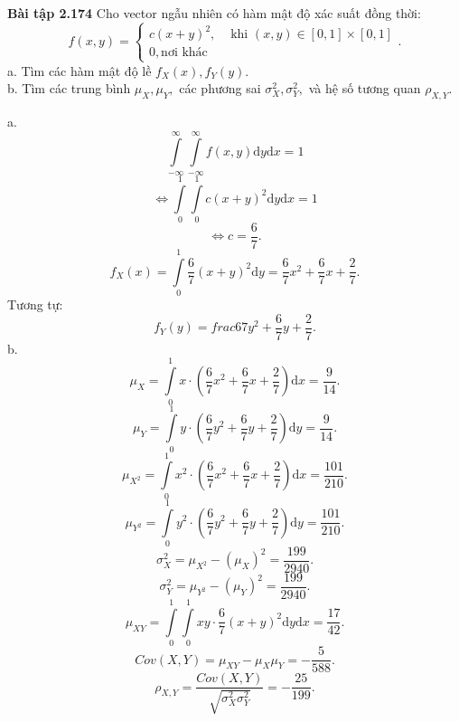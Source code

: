 \documentclass[12pt,a4paper]{article}
\begin{document}
\begin{mybox}
    \textbf{Bài tập 2.174} Cho vector ngẫu nhiên có hàm mật độ xác suất đồng thời:
    $$f \left( {x, y} \right) = 
    \begin{cases}
        c \left( {x + y} \right)^2, &\text{ khi } \left( {x, y} \right) \in \left[ {0, 1} \right] \times \left[ {0, 1} \right]\\
        0, \text{nơi khác}
    \end{cases}
    .$$
    a. Tìm các hàm mật độ lề $f_X \left( x \right), f_Y \left( y \right).$\\
    b. Tìm các trung bình $\mu_X, \mu_Y,$ các phương sai $\sigma _X^2, \sigma_Y^2,$ và hệ số tương quan $\rho_{X, Y}.$
\end{mybox}
a. $$\int\limits_{- \infty}^{\infty}{\int\limits_{- \infty}^{\infty}{f \left( {x, y} \right) \mathrm{d}y}\mathrm{d}x} = 1$$
$$\Leftrightarrow \int\limits_{0}^{1}{\int\limits_{0}^{1}{ c \left( {x + y} \right)^2  \mathrm{d}y}\mathrm{d}x} = 1$$
$$\Leftrightarrow c = \frac{6}{7}.$$
$$f_X \left( x \right) = \int\limits_{0}^{1}{ \frac{6}{7} \left( {x + y} \right)^2  \mathrm{d}y} = \frac{6}{7}x^2 + \frac{6}{7}x + \frac{2}{7}.$$
Tương tự:
$$f_Y \left( y \right) = frac{6}{7}y^2 + \frac{6}{7}y + \frac{2}{7}.$$
b. $$\mu_X = \int\limits_0^1{x \cdot \left( {\frac{6}{7}x^2 + \frac{6}{7}x + \frac{2}{7}} \right) \mathrm{d}x} = \frac{9}{14}.$$
$$\mu_Y = \int\limits_0^1{y \cdot \left( {\frac{6}{7}y^2 + \frac{6}{7}y + \frac{2}{7}} \right) \mathrm{d}y} = \frac{9}{14}.$$
$$\mu_{X^2} = \int\limits_0^1{x^2 \cdot \left( {\frac{6}{7}x^2 + \frac{6}{7}x + \frac{2}{7}} \right) \mathrm{d}x} = \frac{101}{210}.$$
$$\mu_{Y^2} = \int\limits_0^1{y^2 \cdot \left( {\frac{6}{7}y^2 + \frac{6}{7}y + \frac{2}{7}} \right) \mathrm{d}y} = \frac{101}{210}.$$
$$\sigma _X^2 = \mu_{X^2} - \left( {\mu_X} \right)^2 = \frac{199}{2940}.$$
$$\sigma _Y^2 = \mu_{Y^2} - \left( {\mu_Y} \right)^2 = \frac{199}{2940}.$$
$$\mu_{XY} = \int\limits_{0}^{1}{\int\limits_{0}^{1}{xy \cdot \frac{6}{7} \left( {x + y} \right)^2  \mathrm{d}y}\mathrm{d}x} = \frac{17}{42}.$$
$$Cov \left( {X, Y} \right) = \mu_{XY} - {\mu_X}{\mu_Y} = - \frac{5}{588}.$$
$$\rho_{X, Y} = \frac{Cov \left( {X, Y} \right)}{\sqrt{{\sigma _X^2}{\sigma _Y^2}}} = - \frac{25}{199}.$$
\end{document}
